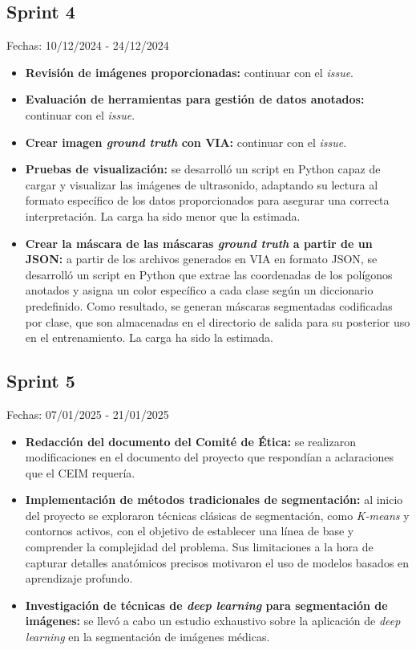 \subsection{Sprint 4}
Fechas: 10/12/2024 - 24/12/2024
\begin{itemize}
    \item \textbf{Revisión de imágenes proporcionadas:} continuar con el \textit{issue}.
    \item \textbf{Evaluación de herramientas para gestión de datos anotados:} continuar con el \textit{issue}.
    \item \textbf{Crear imagen \textit{ground truth} con VIA:} continuar con el \textit{issue}.
    \item \textbf{Pruebas de visualización:} se desarrolló un script en Python capaz de cargar y visualizar las imágenes de ultrasonido, adaptando su lectura al formato específico de los datos proporcionados para asegurar una correcta interpretación. La carga ha sido menor que la estimada.
    \item \textbf{Crear la máscara de las máscaras \textit{ground truth} a partir de un JSON:} a partir de los archivos generados en VIA en formato JSON, se desarrolló un script en Python que extrae las coordenadas de los polígonos anotados y asigna un color específico a cada clase según un diccionario predefinido. Como resultado, se generan máscaras segmentadas codificadas por clase, que son almacenadas en el directorio de salida para su posterior uso en el entrenamiento. La carga ha sido la estimada.
\end{itemize}   

\subsection{Sprint 5}
Fechas: 07/01/2025 - 21/01/2025
\begin{itemize}
    \item \textbf{Redacción del documento del Comité de Ética:} se realizaron modificaciones en el documento del proyecto que respondían a aclaraciones que el CEIM requería.
    \item \textbf{Implementación de métodos tradicionales de segmentación:} al inicio del proyecto se exploraron técnicas clásicas de segmentación, como \textit{K-means} y contornos activos, con el objetivo de establecer una línea de base y comprender la complejidad del problema. Sus limitaciones a la hora de capturar detalles anatómicos precisos motivaron el uso de modelos basados en aprendizaje profundo.
    \item \textbf{Investigación de técnicas de \textit{deep learning} para segmentación de imágenes:} se llevó a cabo un estudio exhaustivo sobre la aplicación de \textit{deep learning} en la segmentación de imágenes médicas.
\end{itemize}

